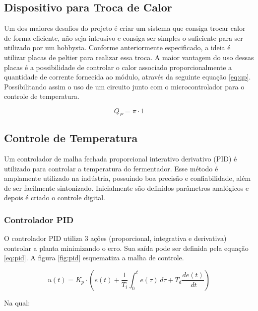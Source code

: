 \subsection{Dispositivo para Troca de Calor}

Um dos maiores desafios do projeto é criar um sistema que consiga trocar calor de forma eficiente, não seja intrusivo e consiga ser simples o suficiente para ser utilizado por um hobbysta. Conforme anteriormente especificado, a ideia é utilizar placas de peltier para realizar essa troca. A maior vantagem do uso dessas placas é a possibilidade de controlar o calor associado proporcionalmente a quantidade de corrente fornecida ao módulo, através da seguinte equação \ref{eq:qp}. Possibilitando assim o uso de um circuito junto com o microcontrolador para o controle de temperatura.

\begin{equation}
    Q_P = \pi \cdot 1
    \label{eq:qp}
\end{equation}


\subsection{Controle de Temperatura}

Um controlador de malha fechada proporcional interativo derivativo (PID) é utilizado para controlar a temperatura do fermentador. Esse método é amplamente utilizado na indústria, possuindo boa precisão e confiabilidade, além de ser facilmente sintonizado. Inicialmente são definidos parâmetros analógicos e depois é criado o controle digital.

\subsubsection{Controlador PID}

O controlador PID utiliza 3 ações (proporcional, integrativa e derivativa) controlar a planta minimizando o erro. Sua saída pode ser definida pela equação \ref{eq:pid}. A figura \ref{fig:pid} esquematiza a malha de controle.

\begin{equation}
    u(t) = K_p \cdot (e(t) + \frac{1}{T_i} \int_{0}^{t} e(\tau) \, d\tau + T_d\dfrac{de(t)}{\, dt})
    \label{eq:pid}
\end{equation}

Na qual:

